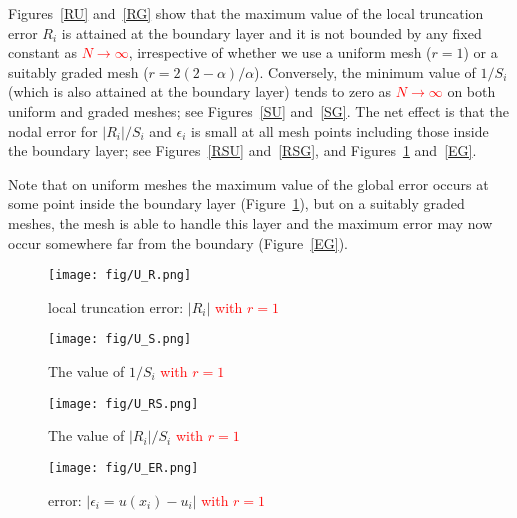 \documentclass[smallextended]{svjour3}       %
\newcommand{\tcr}[1]{\textcolor{red}{#1}}
\begin{document}
Figures~\ref{RU} and~\ref{RG} show that the maximum value of the local truncation error $R_i$ is attained  at the boundary layer
and it is not bounded by any fixed constant as \tcr{$N\rightarrow \infty$}, irrespective of  whether we use a uniform mesh ($r=1$) or a suitably graded mesh 
($r=2(2-\alpha)/\alpha$). 
Conversely, the minimum value of $1/S_i$ (which is also attained at the boundary layer) tends to zero  as \tcr{$N\rightarrow \infty$} on both  uniform and  graded meshes; see Figures~\ref{SU} and~\ref{SG}. 
The net effect is that the nodal error for $\left|R_i\right|/S_i$ and $\epsilon_{i}$ is small at all mesh points including those inside the  boundary layer; 
see Figures~\ref{RSU} and~\ref{RSG},  and Figures~\ref{EU} and~\ref{EG}. 

Note that on uniform meshes the maximum value of the  global  error occurs at some point inside the  boundary layer (Figure~\ref{EU}), but on a suitably graded meshes, the mesh is able to handle this layer and the maximum error may now occur somewhere far from the boundary (Figure~\ref{EG}). 


\begin{figure}[!ht]
	\centering
	\begin{minipage}{0.49\linewidth}
		\centering
		\texttt{[image: fig/U\_R.png]}
		\caption{local truncation error: $\left|R_i\right|$ \tcr{with $r=1$}}
		\label{RU}
	\end{minipage}
	\begin{minipage}{0.49\linewidth}
		\centering
		\texttt{[image: fig/U\_S.png]}
		\caption{The value of $1/S_i$ \tcr{with $r=1$}}
		\label{SU}
	\end{minipage}
\qquad%
\begin{minipage}{0.49\linewidth}
		\centering
		\texttt{[image: fig/U\_RS.png]}
		\caption{The value of $\left|R_i\right|/S_i$ \tcr{with $r=1$}}
		\label{RSU}
	\end{minipage}
	\begin{minipage}{0.49\linewidth}
		\centering
		\texttt{[image: fig/U\_ER.png]}
		\caption{error: $\left|\epsilon_{i}=u(x_i)-u_i \right|$ \tcr{with $r=1$}}
		\label{EU}
	\end{minipage}
\end{figure}
\end{document}
